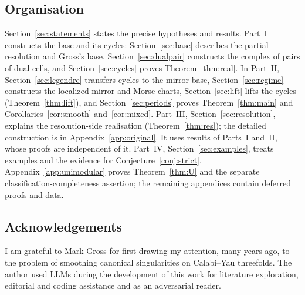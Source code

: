\subsection{Organisation}
Section~\ref{sec:statements} states the precise hypotheses and results. Part~I constructs the base and its cycles:
Section~\ref{sec:base} describes the partial resolution and Gross's base, Section~\ref{sec:dualpair} constructs the
complex of pairs of dual cells, and Section~\ref{sec:cycles} proves Theorem~\ref{thm:real}. In Part~II,
Section~\ref{sec:legendre} transfers cycles to the mirror base, Section~\ref{sec:regime} constructs the localized
mirror and Morse charts, Section~\ref{sec:lift} lifts the cycles (Theorem~\ref{thm:lift}), and
Section~\ref{sec:periods} proves Theorem~\ref{thm:main} and Corollaries~\ref{cor:smooth} and~\ref{cor:mixed}. Part~III,
Section~\ref{sec:resolution}, explains the resolution-side realisation (Theorem~\ref{thm:res}); the detailed construction
is in Appendix~\ref{app:original}. It uses results of Parts~I and~II, whose proofs are independent of it. Part~IV, Section~\ref{sec:examples}, treats examples and the evidence for Conjecture~\ref{conj:strict}.
Appendix~\ref{app:unimodular} proves Theorem~\ref{thm:U} and the separate classification-completeness assertion; the remaining appendices
contain deferred proofs and data.

\subsection*{Acknowledgements}
I am grateful to Mark Gross for first drawing my attention, many years ago, to the problem of smoothing canonical singularities on Calabi--Yau threefolds.
The author used LLMs during the development of this work for literature exploration, editorial and coding assistance and as an adversarial reader.
